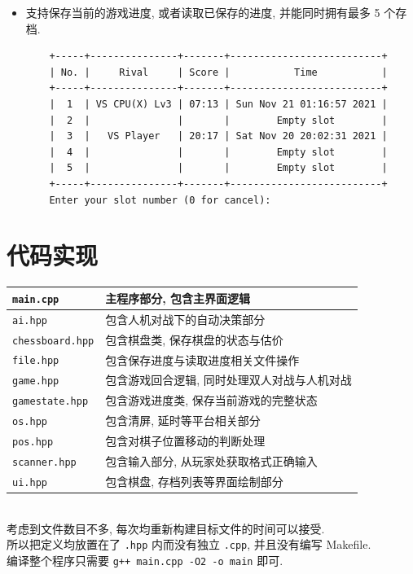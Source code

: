 \documentclass[12pt]{article}
\begin{document}
\begin{itemize}
    \item 支持保存当前的游戏进度, 或者读取已保存的进度, 并能同时拥有最多 5 个存档.
    \begin{verbatim}
    +-----+---------------+-------+--------------------------+
    | No. |     Rival     | Score |           Time           |
    +-----+---------------+-------+--------------------------+
    |  1  | VS CPU(X) Lv3 | 07:13 | Sun Nov 21 01:16:57 2021 |
    |  2  |               |       |        Empty slot        |
    |  3  |   VS Player   | 20:17 | Sat Nov 20 20:02:31 2021 |
    |  4  |               |       |        Empty slot        |
    |  5  |               |       |        Empty slot        |
    +-----+---------------+-------+--------------------------+
    Enter your slot number (0 for cancel): \end{verbatim}
\end{itemize}

\section{代码实现}

\begin{tabular}{|l|l|}
\hline \texttt{main.cpp} & 主程序部分, 包含主界面逻辑 \\
\hline \texttt{ai.hpp} & 包含人机对战下的自动决策部分 \\
\hline \texttt{chessboard.hpp} & 包含棋盘类, 保存棋盘的状态与估价 \\
\hline \texttt{file.hpp} & 包含保存进度与读取进度相关文件操作 \\
\hline \texttt{game.hpp} & 包含游戏回合逻辑, 同时处理双人对战与人机对战 \\
\hline \texttt{gamestate.hpp} & 包含游戏进度类, 保存当前游戏的完整状态 \\
\hline \texttt{os.hpp} & 包含清屏, 延时等平台相关部分 \\
\hline \texttt{pos.hpp} & 包含对棋子位置移动的判断处理 \\
\hline \texttt{scanner.hpp} & 包含输入部分, 从玩家处获取格式正确输入 \\
\hline \texttt{ui.hpp} & 包含棋盘, 存档列表等界面绘制部分 \\
\hline
\end{tabular}
\\

\indent 考虑到文件数目不多, 每次均重新构建目标文件的时间可以接受. \\
\indent 所以把定义均放置在了 \texttt{.hpp} 内而没有独立 \texttt{.cpp}, 并且没有编写 Makefile. \\
\indent 编译整个程序只需要 \texttt{g++ main.cpp -O2 -o main} 即可.
\end{document}
